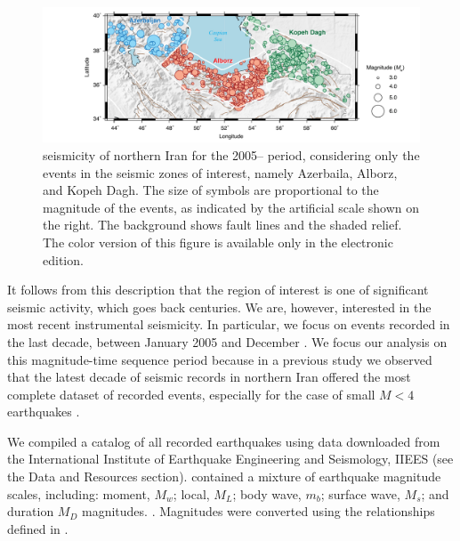 \begin{figure}[t]
	\centering
	\includegraphics[width=\textwidth]{figures/pdf/figure-03} 
	\caption{ seismicity of northern Iran for the 2005-- period, considering only the events in the seismic zones of interest, namely Azerbaila, Alborz, and Kopeh Dagh. The size of symbols are proportional to the magnitude of the events, as indicated by the artificial scale shown on the right. The background shows fault lines and the shaded relief. The color version of this figure is available only in the electronic edition.}
	\label{fig:seismicity}
\end{figure}

It follows from this description that the region of interest is one of significant seismic activity, which goes back centuries. We are, however, interested in the most recent instrumental seismicity. In particular, we focus on events recorded in the last decade, between January 2005 and December . We focus our analysis on this magnitude-time sequence period because in a previous study we observed that the latest decade of seismic records in northern Iran offered the most complete dataset of recorded events, especially for the case of small $M < 4$ earthquakes \citep{Khoshnevis2017}. 

We compiled a catalog of all recorded earthquakes using data downloaded from the International Institute of Earthquake Engineering and Seismology, IIEES (see the Data and Resources section).  contained a mixture of earthquake magnitude scales, including: moment, $M_w$; local, $M_L$; body wave, $m_b$; surface wave, $M_s$; and duration $M_D$ magnitudes. . Magnitudes were converted using the relationships defined in \citet{Zare2014}.

